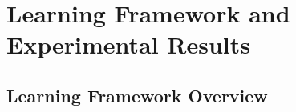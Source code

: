 %
%     
%
%

\chapter{Learning Framework and Experimental Results}
\label{ch:learning_framework}
\label{ch:results}

\providecommand{\pending}[1]{\textcolor{red}{[pending: #1]}}

\section{Learning Framework Overview}


